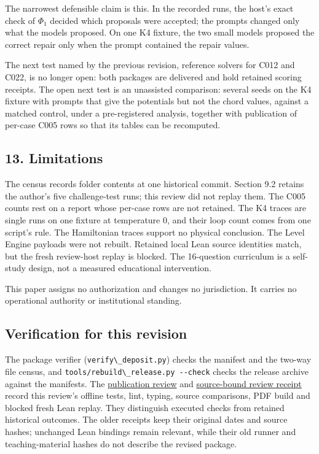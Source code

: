 \documentclass[
  11pt,
]{article}
\newcommand{\passthrough}[1]{#1}
\begin{document}
The narrowest defensible claim is this. In the recorded runs, the host's
exact check of \(\Phi_1\) decided which proposals were accepted; the
prompts changed only what the models proposed. On one K4 fixture, the
two small models proposed the correct repair only when the prompt
contained the repair values.

The next test named by the previous revision, reference solvers for C012
and C022, is no longer open: both packages are delivered and hold
retained scoring receipts. The open next test is an unassisted
comparison: several seeds on the K4 fixture with prompts that give the
potentials but not the chord values, against a matched control, under a
pre-registered analysis, together with publication of per-case C005 rows
so that its tables can be recomputed.

\hypertarget{limitations}{%
\subsection{13. Limitations}\label{limitations}}

The census records folder contents at one historical commit. Section 9.2
retains the author's five challenge-test runs; this review did not
replay them. The C005 counts rest on a report whose per-case rows are
not retained. The K4 traces are single runs on one fixture at
temperature 0, and their loop count comes from one script's rule. The
Hamiltonian traces support no physical conclusion. The Level Engine
payloads were not rebuilt. Retained local Lean source identities match,
but the fresh review-host replay is blocked. The 16-question curriculum
is a self-study design, not a measured educational intervention.

This paper assigns no authorization and changes no jurisdiction. It
carries no operational authority or institutional standing.

\hypertarget{verification-for-this-revision}{%
\subsection{Verification for this
revision}\label{verification-for-this-revision}}

The package verifier (\passthrough{\lstinline!verify\_deposit.py!})
checks the manifest and the two-way file census, and
\passthrough{\lstinline!tools/rebuild\_release.py --check!} checks the
release archive against the manifests. The
\href{../../008_pfp_mssn_tower_challenges_and_retraction_benchmarks/docs/publication_review_2026_10_02.md}{publication
review} and
\href{../../008_pfp_mssn_tower_challenges_and_retraction_benchmarks/docs/review_validation_2026_10_02.json}{source-bound
review receipt} record this review's offline tests, lint, typing, source
comparisons, PDF build and blocked fresh Lean replay. They distinguish
executed checks from retained historical outcomes. The older receipts
keep their original dates and source hashes; unchanged Lean bindings
remain relevant, while their old runner and teaching-material hashes do
not describe the revised package.
\end{document}
